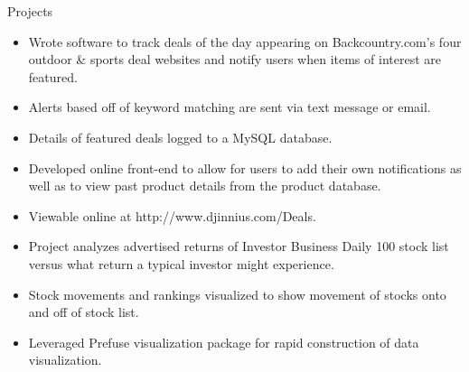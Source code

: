 \begin{category}{Projects}
\begin{itemize}
\item Wrote software to track deals of the day appearing on Backcountry.com's four outdoor \& sports deal websites and notify users when items of interest are featured.
\item Alerts based off of keyword matching are sent via text message or email.
\item Details of featured deals logged to a MySQL database. 
\item Developed online front-end to allow for users to add their own notifications as well as to view past product details from the product database.
\item Viewable online at http://www.djinnius.com/Deals.
\end{itemize}
\begin{itemize}
\item Project analyzes advertised returns of Investor Business Daily 100 stock list versus what return a typical investor might experience.
\item Stock movements and rankings visualized to show movement of stocks onto and off of stock list.
\item Leveraged Prefuse visualization package for rapid construction of data visualization.
\end{itemize}

\end{category}

